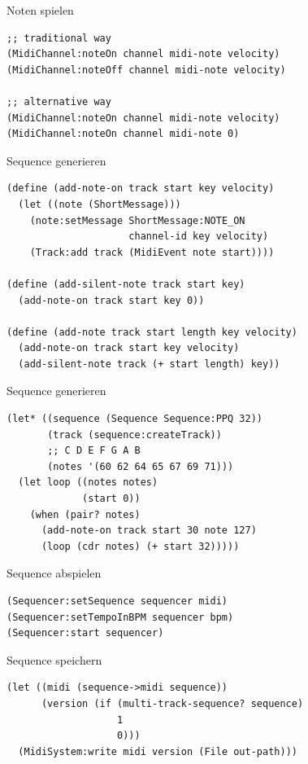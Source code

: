 \documentclass[presentation]{beamer}
\begin{document}
\begin{frame}[fragile,label=sec-3-3]{Noten spielen}
 \begin{verbatim}
;; traditional way
(MidiChannel:noteOn channel midi-note velocity)
(MidiChannel:noteOff channel midi-note velocity)

;; alternative way
(MidiChannel:noteOn channel midi-note velocity)
(MidiChannel:noteOn channel midi-note 0)
\end{verbatim}
\end{frame}

\begin{frame}[fragile,label=sec-3-4]{Sequence generieren}
 \begin{verbatim}
(define (add-note-on track start key velocity)
  (let ((note (ShortMessage)))
    (note:setMessage ShortMessage:NOTE_ON
                     channel-id key velocity)
    (Track:add track (MidiEvent note start))))

(define (add-silent-note track start key)
  (add-note-on track start key 0))

(define (add-note track start length key velocity)
  (add-note-on track start key velocity)
  (add-silent-note track (+ start length) key))
\end{verbatim}
\end{frame}

\begin{frame}[fragile,label=sec-3-5]{Sequence generieren}
 \begin{verbatim}
(let* ((sequence (Sequence Sequence:PPQ 32))
       (track (sequence:createTrack))
       ;; C D E F G A B
       (notes '(60 62 64 65 67 69 71)))
  (let loop ((notes notes)
             (start 0))
    (when (pair? notes)
      (add-note-on track start 30 note 127)
      (loop (cdr notes) (+ start 32)))))
\end{verbatim}
\end{frame}

\begin{frame}[fragile,label=sec-3-6]{Sequence abspielen}
 \begin{verbatim}
(Sequencer:setSequence sequencer midi)
(Sequencer:setTempoInBPM sequencer bpm)
(Sequencer:start sequencer)
\end{verbatim}
\end{frame}

\begin{frame}[fragile,label=sec-3-7]{Sequence speichern}
 \begin{verbatim}
(let ((midi (sequence->midi sequence))
      (version (if (multi-track-sequence? sequence)
                   1
                   0)))
  (MidiSystem:write midi version (File out-path)))
\end{verbatim}
\end{frame}
\end{document}
